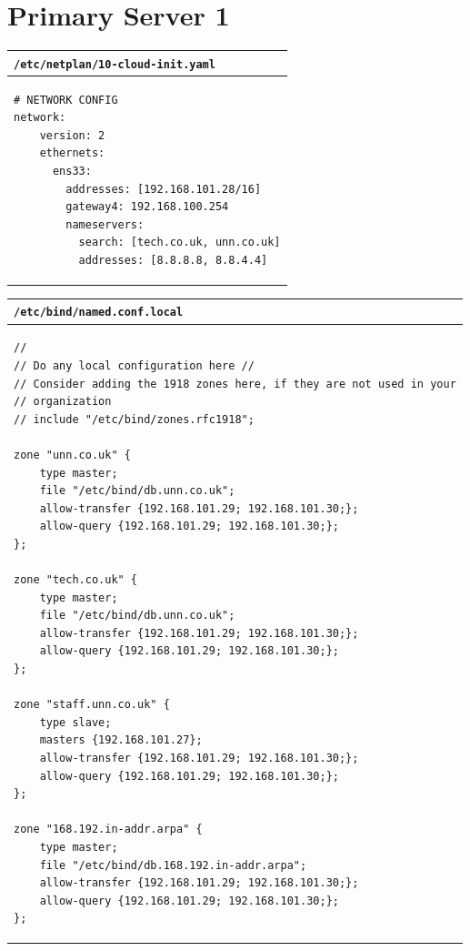 \documentclass[11pt]{article}
\begin{document}
\section{Primary Server 1}
\begin{table}[ht]
    \begin{tabular}{|p{17.5cm}|} 
        \hline
        \texttt{\textbf{/etc/netplan/10-cloud-init.yaml}}\\ 
        \hline
        \lstset{
                basicstyle=\scriptsize\ttfamily,
              }
              \begin{lstlisting}
# NETWORK CONFIG
network:
    version: 2
    ethernets:
      ens33:
        addresses: [192.168.101.28/16]
        gateway4: 192.168.100.254
        nameservers:
          search: [tech.co.uk, unn.co.uk]
          addresses: [8.8.8.8, 8.8.4.4]
        \end{lstlisting}\\
        \hline
    \end{tabular}
\end{table}

\begin{table}[ht]
    \begin{tabular}{|p{17.5cm}|} 
        \hline
        \texttt{\textbf{/etc/bind/named.conf.local}}\\ 
        \hline
        \lstset{
                basicstyle=\scriptsize\ttfamily,
              }
              \begin{lstlisting}
// 
// Do any local configuration here //
// Consider adding the 1918 zones here, if they are not used in your
// organization
// include "/etc/bind/zones.rfc1918";
                
zone "unn.co.uk" {
    type master;
    file "/etc/bind/db.unn.co.uk";
    allow-transfer {192.168.101.29; 192.168.101.30;};
    allow-query {192.168.101.29; 192.168.101.30;};
};
                
zone "tech.co.uk" {
    type master;
    file "/etc/bind/db.unn.co.uk";
    allow-transfer {192.168.101.29; 192.168.101.30;};
    allow-query {192.168.101.29; 192.168.101.30;};
};
                
zone "staff.unn.co.uk" {
    type slave;
    masters {192.168.101.27};
    allow-transfer {192.168.101.29; 192.168.101.30;};
    allow-query {192.168.101.29; 192.168.101.30;};
};
                
zone "168.192.in-addr.arpa" {
    type master;
    file "/etc/bind/db.168.192.in-addr.arpa";
    allow-transfer {192.168.101.29; 192.168.101.30;};
    allow-query {192.168.101.29; 192.168.101.30;};
};
        \end{lstlisting}\\
        \hline
    \end{tabular}
\end{table}
\end{document}
